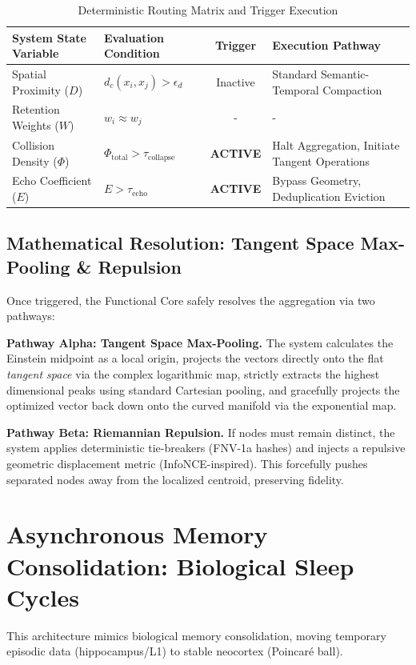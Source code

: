 \documentclass[11pt, a4paper]{article}
\begin{document}
    \begin{table}[h]
    \centering
    \caption{Deterministic Routing Matrix and Trigger Execution}
    \vspace{0.2cm}
    \begin{tabularx}{\textwidth}{llcX}
    \toprule
    \textbf{System State Variable} & \textbf{Evaluation Condition} & \textbf{Trigger} & \textbf{Execution Pathway} \\
    \midrule
    Spatial Proximity ($D$) & $d_c(x_i,x_j) > \epsilon_d$ & Inactive & Standard Semantic-Temporal Compaction \\
    Retention Weights ($W$) & $w_i \approx w_j$ & - & - \\
    Collision Density ($\Phi$) & $\Phi_{\text{total}} > \tau_{\text{collapse}}$ & \textbf{ACTIVE} & Halt Aggregation, Initiate Tangent Operations \\
    Echo Coefficient ($E$) & $E > \tau_{\text{echo}}$ & \textbf{ACTIVE} & Bypass Geometry, Deduplication Eviction \\
    \bottomrule
    \end{tabularx}
    \end{table}

    \subsection{Mathematical Resolution: Tangent Space Max-Pooling \& Repulsion}
    Once triggered, the Functional Core safely resolves the aggregation via two pathways:
    
    \textbf{Pathway Alpha: Tangent Space Max-Pooling.} The system calculates the Einstein midpoint as a local origin, projects the vectors directly onto the flat \textit{tangent space} via the complex logarithmic map, strictly extracts the highest dimensional peaks using standard Cartesian pooling, and gracefully projects the optimized vector back down onto the curved manifold via the exponential map.
    
    \textbf{Pathway Beta: Riemannian Repulsion.} If nodes must remain distinct, the system applies deterministic tie-breakers (FNV-1a hashes) and injects a repulsive geometric displacement metric (InfoNCE-inspired). This forcefully pushes separated nodes away from the localized centroid, preserving fidelity.

    \section{Asynchronous Memory Consolidation: Biological Sleep Cycles}
    This architecture mimics biological memory consolidation, moving temporary episodic data (hippocampus/L1) to stable neocortex (Poincaré ball). 
    
\end{document}
